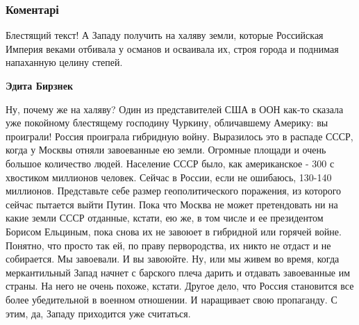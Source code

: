  
 
 
 
 
\subsubsection{Коментарі}
\label{sec:21_07_2021.fb.mischishin_mihail.1.pismo_patriotam.cmt}

\begin{itemize}
 

Блестящий текст! А Западу получить на халяву земли, которые Российская Империя
веками отбивала у османов и осваивала их, строя города и поднимая напаханную
целину степей.

\begin{itemize}
 
\textbf{Эдита Бирзнек} 

Ну, почему же на халяву? Один из представителей США в
ООН как-то сказала уже покойному блестящему господину Чуркину, обличавшему
Америку: вы проиграли! Россия проиграла гибридную войну. Выразилось это в
распаде СССР, когда у Москвы отняли завоеванные ею земли. Огромные площади и
очень большое количество людей. Население СССР было, как американское - 300 с
хвостиком миллионов человек. Сейчас в России, если не ошибаюсь, 130-140
миллионов. Представьте себе размер геополитического поражения, из которого
сейчас пытается выйти Путин. Пока что Москва не может претендовать ни на какие
земли СССР отданные, кстати, ею же, в том числе и ее президентом Борисом
Ельциным, пока снова их не завоюет в гибридной или горячей войне. Понятно, что
просто так ей, по праву первородства, их никто не отдаст и не собирается. Мы
завоевали. И вы завоюйте. Ну, или мы живем во время, когда меркантильный Запад
начнет с барского плеча дарить и отдавать завоеванные им страны. На него не
очень похоже, кстати. Другое дело, что Россия становится все более убедительной
в военном отношении. И наращивает свою пропаганду. С этим, да, Западу
приходится уже считаться.


\end{itemize}
\end{itemize}
